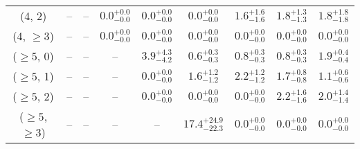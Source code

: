\begin{table}[h!]
{\begin{tabular}{ccccccccc}
	(4, 2) & -- & -- & $0.0^{+ 0.0 }_{- 0.0 }$ & $0.0^{+ 0.0 }_{- 0.0 }$ & $0.0^{+ 0.0 }_{- 0.0 }$ & $1.6^{+ 1.6 }_{- 1.6 }$ & $1.8^{+ 1.3 }_{- 1.3 }$ & $1.8^{+ 1.8 }_{- 1.8 }$ \\[0.5ex] 
	(4, $\ge3$) & -- & -- & $0.0^{+ 0.0 }_{- 0.0 }$ & $0.0^{+ 0.0 }_{- 0.0 }$ & $0.0^{+ 0.0 }_{- 0.0 }$ & $0.0^{+ 0.0 }_{- 0.0 }$ & $0.0^{+ 0.0 }_{- 0.0 }$ & $0.0^{+ 0.0 }_{- 0.0 }$ \\[0.5ex] 
	($\ge5$, 0) & -- & -- & -- & $3.9^{+ 4.3 }_{- 4.2 }$ & $0.6^{+ 0.3 }_{- 0.3 }$ & $0.8^{+ 0.3 }_{- 0.3 }$ & $0.8^{+ 0.3 }_{- 0.3 }$ & $1.9^{+ 0.4 }_{- 0.4 }$ \\[0.5ex] 
	($\ge5$, 1) & -- & -- & -- & $0.0^{+ 0.0 }_{- 0.0 }$ & $1.6^{+ 1.2 }_{- 1.2 }$ & $2.2^{+ 1.2 }_{- 1.2 }$ & $1.7^{+ 0.8 }_{- 0.8 }$ & $1.1^{+ 0.6 }_{- 0.6 }$ \\[0.5ex] 
	($\ge5$, 2) & -- & -- & -- & $0.0^{+ 0.0 }_{- 0.0 }$ & $0.0^{+ 0.0 }_{- 0.0 }$ & $0.0^{+ 0.0 }_{- 0.0 }$ & $2.2^{+ 1.6 }_{- 1.6 }$ & $2.0^{+ 1.4 }_{- 1.4 }$ \\[0.5ex] 
	($\ge5$, $\ge3$) & -- & -- & -- & -- & $17.4^{+ 24.9 }_{- 22.3 }$ & $0.0^{+ 0.0 }_{- 0.0 }$ & $0.0^{+ 0.0 }_{- 0.0 }$ & $0.0^{+ 0.0 }_{- 0.0 }$ \\[0.5ex] 
	\hline
	\hline
\end{tabular}}
\end{table}
